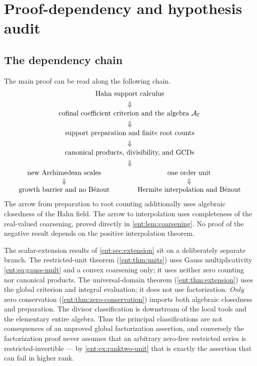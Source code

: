 \documentclass[11pt]{article}
\theoremstyle{plain}
\theoremstyle{plain}
\theoremstyle{plain}
\theoremstyle{definition}
\theoremstyle{definition}
\theoremstyle{definition}
\theoremstyle{definition}
\theoremstyle{remark}
\newcommand{\A}{\mathcal A_\Gamma}\newcommand{\OO}{\mathcal O_\Gamma}
\begin{document}
\appendix
\section{Proof-dependency and hypothesis audit}
\label{ent:app:audit}

\subsection{The dependency chain}
The main proof can be read along the following chain.
\[
 \begin{gathered}
 \text{Hahn support calculus}\\
 \Downarrow\\[-2pt]
 \text{cofinal coefficient criterion and the algebra }\A\\
 \Downarrow\\[-2pt]
 \text{support preparation and finite root counts}\\
 \Downarrow\\[-2pt]
 \text{canonical products, divisibility, and GCDs}\\
 \Downarrow\\[-2pt]
 \begin{array}{c@{\qquad\qquad}c}
 \text{new Archimedean scales}&\text{one order unit}\\
 \Downarrow&\Downarrow\\
 \text{growth barrier and no B\'ezout}
 &\text{Hermite interpolation and B\'ezout}
 \end{array}
 \end{gathered}
\]
The arrow from preparation to root counting additionally uses algebraic
closedness of the Hahn field. The arrow to interpolation uses completeness of
the real-valued coarsening, proved directly in \cref{ent:lem:coarsening}. No
proof of the negative result depends on the positive interpolation theorem.

The scalar-extension results of \cref{ent:sec:extension} sit on a deliberately
separate branch. The restricted-unit theorem
(\cref{ent:thm:units}) uses Gauss multiplicativity
\eqref{ent:eq:gauss-mult} and a convex coarsening only; it uses neither zero
counting nor canonical products. The universal-domain theorem
(\cref{ent:thm:extension}) uses the global criterion and integral evaluation;
it does not use factorization. \emph{Only} zero conservation
(\cref{ent:thm:zero-conservation}) imports both algebraic closedness and
preparation. The divisor classification is downstream of the local tools and
the elementary entire algebra. Thus the principal classifications are not
consequences of an unproved global factorization assertion, and conversely
the factorization proof never assumes that an arbitrary zero-free restricted
series is restricted-invertible --- by
\cref{ent:ex:ranktwo-unit} that is exactly the assertion that can fail in
higher rank.
\end{document}
